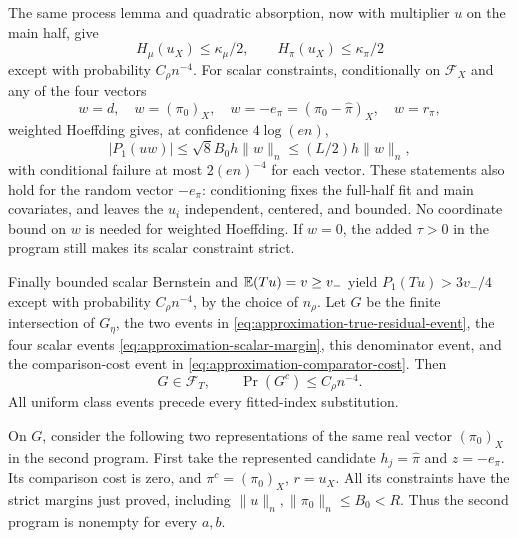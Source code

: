The same process lemma and quadratic absorption, now with multiplier
$u$ on the main half, give
\begin{equation}
 H_\mu(u_X)\le\kappa_\mu/2,\qquad
 H_\pi(u_X)\le\kappa_\pi/2
 \label{eq:approximation-true-residual-event}
\end{equation}
except with probability $C_\rho n^{-4}$. For scalar constraints,
conditionally on $\mathcal F_X$ and any of the four vectors
\[
 w=d,\quad w=(\pi_0)_X,\quad
 w=-e_\pi=(\pi_0-\widehat\pi)_X,\quad w=r_\pi,
\]
weighted Hoeffding gives, at confidence $4\log(en)$,
\begin{equation}
 |P_1(uw)|\le\sqrt8 B_0h\|w\|_n
 \le (L/2)h\|w\|_n,
 \label{eq:approximation-scalar-margin}
\end{equation}
with conditional failure at most $2(en)^{-4}$ for each vector.
These statements also hold for the random vector $-e_\pi$: conditioning
fixes the full-half fit and main covariates, and leaves the $u_i$
independent, centered, and bounded. No coordinate bound on $w$ is
needed for weighted Hoeffding. If $w=0$, the added $\tau>0$ in the
program still makes its scalar constraint strict.

Finally bounded scalar Bernstein and $\mathbb E(Tu)=v\ge v_-$ yield
$P_1(Tu)>3v_-/4$ except with probability $C_\rho n^{-4}$, by the
choice of $n_\rho$. Let $G$ be the finite intersection of $G_\eta$,
the two events in \eqref{eq:approximation-true-residual-event}, the four
scalar events \eqref{eq:approximation-scalar-margin}, this denominator
event, and the comparison-cost event in
\eqref{eq:approximation-comparator-cost}. Then
\begin{equation}
 G\in\mathcal F_T,\qquad \Pr(G^c)\le C_\rho n^{-4}.
 \label{eq:approximation-good-event}
\end{equation}
All uniform class events precede every fitted-index substitution.

On $G$, consider the following two representations of the same real
vector $(\pi_0)_X$ in the second program. First take the represented
candidate $h_j=\widehat\pi$ and $z=-e_\pi$. Its comparison cost is
zero, and $\pi^c=(\pi_0)_X$, $r=u_X$. All its constraints have the
strict margins just proved, including
$\|u\|_n,\|\pi_0\|_n\le B_0<R$. Thus the second program is
nonempty for every $a,b$.

